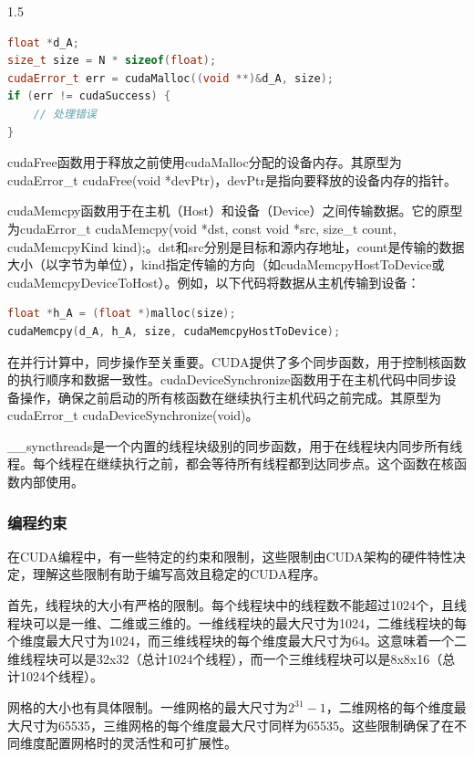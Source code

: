 \documentclass[zihao=-4]{ctexart}
\begin{document}
\begin{spacing}{1.5}
\begin{lstlisting}[language=C++,title={设备内存分配示例}]
float *d_A;
size_t size = N * sizeof(float);
cudaError_t err = cudaMalloc((void **)&d_A, size);
if (err != cudaSuccess) {
    // 处理错误
}
\end{lstlisting}

cudaFree函数用于释放之前使用cudaMalloc分配的设备内存。其原型为cudaError\_t cudaFree(void *devPtr)，devPtr是指向要释放的设备内存的指针。

cudaMemcpy函数用于在主机（Host）和设备（Device）之间传输数据。它的原型为cudaError\_t cudaMemcpy(void *dst, const void *src, size\_t count, cudaMemcpyKind kind);。dst和src分别是目标和源内存地址，count是传输的数据大小（以字节为单位），kind指定传输的方向（如cudaMemcpyHostToDevice或cudaMemcpyDeviceToHost）。例如，以下代码将数据从主机传输到设备：

\begin{lstlisting}[language=C++,title={数据传输示例}]
float *h_A = (float *)malloc(size);
cudaMemcpy(d_A, h_A, size, cudaMemcpyHostToDevice);
\end{lstlisting}

在并行计算中，同步操作至关重要。CUDA提供了多个同步函数，用于控制核函数的执行顺序和数据一致性。cudaDeviceSynchronize函数用于在主机代码中同步设备操作，确保之前启动的所有核函数在继续执行主机代码之前完成。其原型为cudaError\_t cudaDeviceSynchronize(void)。

\_\_syncthreads是一个内置的线程块级别的同步函数，用于在线程块内同步所有线程。每个线程在继续执行之前，都会等待所有线程都到达同步点。这个函数在核函数内部使用。

\subsubsection{编程约束}

在CUDA编程中，有一些特定的约束和限制，这些限制由CUDA架构的硬件特性决定，理解这些限制有助于编写高效且稳定的CUDA程序。

首先，线程块的大小有严格的限制。每个线程块中的线程数不能超过1024个，且线程块可以是一维、二维或三维的。一维线程块的最大尺寸为1024，二维线程块的每个维度最大尺寸为1024，而三维线程块的每个维度最大尺寸为64。这意味着一个二维线程块可以是32x32（总计1024个线程），而一个三维线程块可以是8x8x16（总计1024个线程）。

网格的大小也有具体限制。一维网格的最大尺寸为$2^{31}-1$，二维网格的每个维度最大尺寸为65535，三维网格的每个维度最大尺寸同样为65535。这些限制确保了在不同维度配置网格时的灵活性和可扩展性。


\end{spacing}
\end{document}

